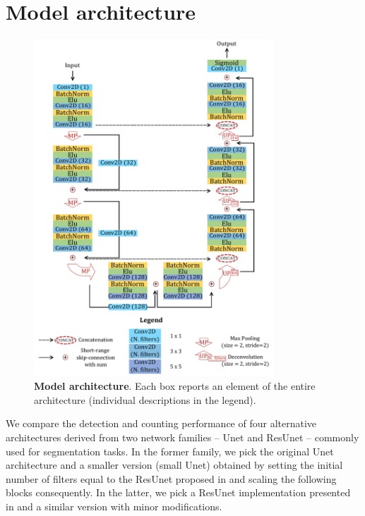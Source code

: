 \section{Model architecture}
\label{model_architecture}

\begin{figure}
\centerline{
\includegraphics[width=0.8\textwidth]{figures/130_methods/c-resunet_architecture.pdf}
}
\caption{\textbf{Model architecture}. Each box reports an element of the entire architecture (individual descriptions in the legend). 
} \label{fig:model_architecture}
\end{figure}
We compare the detection and counting performance of four alternative architectures derived from two network families -- Unet and ResUnet -- commonly used for segmentation tasks.
In the former family, we pick the original Unet architecture \cite{unet} and a smaller version (small Unet) obtained by setting the initial number of filters equal to the ResUnet proposed in  and scaling the following blocks consequently.
In the latter, we pick a ResUnet implementation presented in  and a similar version with minor modifications.
